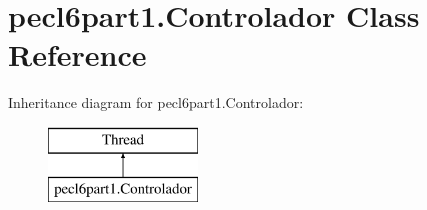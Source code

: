 \hypertarget{classpecl6part1_1_1_controlador}{}\section{pecl6part1.\+Controlador Class Reference}
\label{classpecl6part1_1_1_controlador}
Inheritance diagram for pecl6part1.\+Controlador\+:\begin{figure}[H]
\begin{center}
\leavevmode
\includegraphics[height=2.000000cm]{classpecl6part1_1_1_controlador}
\end{center}
\end{figure}

